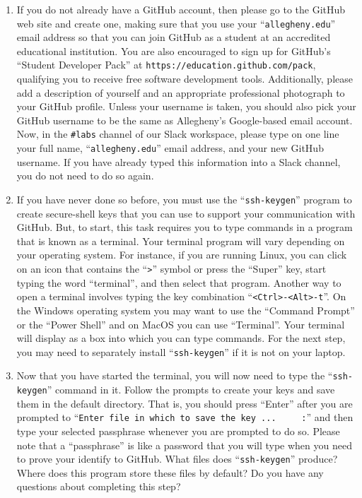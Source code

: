 \documentclass[11pt]{article}
\newcommand{\command}[1]{``\lstinline{#1}''}
\newcommand{\url}[1]{\lstinline{#1}}
\newcommand{\channel}[1]{\lstinline{#1}}
\begin{document}
\begin{enumerate}

  \itemsep 0in

  \item If you do not already have a GitHub account, then please go to the
    GitHub web site and create one, making sure that you use your
    \command{allegheny.edu} email address so that you can join GitHub as a
    student at an accredited educational institution. You are also encouraged to
    sign up for GitHub's ``Student Developer Pack'' at
    \url{https://education.github.com/pack}, qualifying you to receive free
    software development tools. Additionally, please add a description of
    yourself and an appropriate professional photograph to your GitHub profile.
    Unless your username is taken, you should also pick your GitHub username to
    be the same as Allegheny's Google-based email account. Now, in the
    \channel{#labs} channel of our Slack workspace, please type on one line your
    full name, \command{allegheny.edu} email address, and your new GitHub
    username. If you have already typed this information into a Slack channel,
    you do not need to do so again.

  \item If you have never done so before, you must use the \command{ssh-keygen}
    program to create secure-shell keys that you can use to support your
    communication with GitHub. But, to start, this task requires you to type
    commands in a program that is known as a terminal.
    Your terminal program will vary depending on your operating system. For
    instance, if you are running Linux, you can click on an icon that contains
    the \command{>} symbol or press the ``Super'' key, start typing the word
    ``terminal'', and then select that program. Another way to open a terminal
    involves typing the key combination \command{<Ctrl>-<Alt>-t}.
    On the Windows operating system you may want to use the ``Command Prompt''
    or the ``Power Shell'' and on MacOS you can use ``Terminal''.
    Your terminal will display as a box into which you can type commands.
    For the next step, you may need to separately install \command{ssh-keygen}
    if it is not on your laptop.

  \item Now that you have started the terminal, you will now need to type the
    \command{ssh-keygen} command in it. Follow the prompts to create your keys
    and save them in the default directory. That is, you should press ``Enter''
    after you are prompted to \command{Enter file in which to save the key ...
    :} and then type your selected passphrase whenever you are prompted to do
    so. Please note that a ``passphrase'' is like a password that you will type
    when you need to prove your identify to GitHub. What files does
    \command{ssh-keygen} produce? Where does this program store these files by
    default? Do you have any questions about completing this step?


\end{enumerate}
\end{document}
